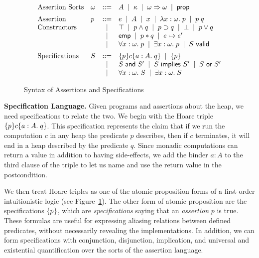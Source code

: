 \documentclass[natbib]{sigplanconf}
\begin{document}
\begin{figure}
{\small
\begin{displaymath}
\begin{array}{llcl}
\mbox{Assertion Sorts} & 
\omega & ::= & A \;\;|\;\; \kappa \;\;|\;\; \omega \Rightarrow \omega \;\;|\;\; \mbox{\textsf{{prop}}} 
\\[0.5em]
\mbox{Assertion} & 
p & ::= & e \;\;|\;\; A \;\;|\;\; x \;\;|\;\; \lambda x:\omega.\;p \;\;|\;\; p\;q \\
\mbox{Constructors}
& &  |  & \top \;\;|\;\; p \land q \;\;|\;\; p \supset q 
          \;\;|\;\; \bot \;\;|\;\; p \vee q \\
& &  |  &  \mathsf{emp} \;\;|\;\; p * q  \;\;|\;\; e \mapsto e' \\
& &  |  & \forall x:\omega.\; p \;\;|\;\; \exists x:\omega.\; p \;\;|\;\;
          {S}\mbox{\textsf{{ valid}}} 
\\[0.5em]
\mbox{Specifications} &
S & ::= & \{{p}\}{c}\{{a:A}.\;{q}\}  \;\;|\;\; \{{p}\} \\
& &  |  & S \;\mbox{\textsf{{and}}}\; S' \;\;|\;\; S \mbox{\textsf{{ implies }}} S' \;\;|\;\; S \mbox{\textsf{{ or }}} S' \\
& &  |  & \forall x:\omega.\; S \;\;|\;\; \exists x:\omega.\;S 
\\
\end{array}
\end{displaymath}
}
\caption{Syntax of Assertions and Specifications}
\label{assert-syntax}
\end{figure}

\textbf{Specification Language.} Given programs and assertions about
the heap, we need specifications to relate the two. We begin with the
Hoare triple $\{{p}\}{c}\{{a:A}.\;{q}\}$. This specification represents the
claim that if we run the computation $c$ in any heap the predicate $p$
describes, then if $c$ terminates, it will end in a heap described by
the predicate $q$. Since monadic computations can return a value in
addition to having side-effects, we add the binder $a:A$ to the third
clause of the triple to let us name and use the return value in the
postcondition. 

We then treat Hoare triples as one of the atomic proposition forms of
a first-order intuitionistic logic (see
Figure~\ref{assert-syntax}). The other form of atomic proposition are
the specifications $\{{p}\}$, which are \emph{specifications} saying that
an \emph{assertion} $p$ is true. These formulas are useful for
expressing aliasing relations between defined predicates, without
necessarily revealing the implementations. In addition, we can form
specifications with conjunction, disjunction, implication, and
universal and existential quantification over the sorts of the
assertion language. 
\end{document}
